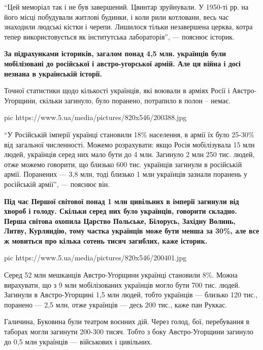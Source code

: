 \enquote{Цей меморіал так і не був завершений. Цвинтар зруйнували. У 1950-ті рр.
на його місці побудували житлові будинки, і коли рили котловани, весь час
знаходили людські кістки і черепи. Лишилося тільки незавершена церква,
котра тепер використовується як інститутська лабораторія}, --- пояснює
історик.

\begin{leftbar}
	\bfseries
За підрахунками істориків, загалом понад 4,5 млн. українців були
мобілізовані до російської і австро-угорської армій. Але ця війна і досі
незнана в українській історії.
\end{leftbar}

Точної статистики щодо кількості українців, які воювали в арміях Росії і
Австро-Угорщини, скільки загинуло, було поранено, потрапило в полон –
немає.

\ifcmt
pic https://www.5.ua/media/pictures/820x546/200388.jpg
\fi

\enquote{У Російській імперії українці становили 18\% населення, в армії їх було
25-30\% від загальної численності. Можемо розрахувати: якщо Росія
мобілізувала 15 млн людей, українців серед них мало бути до 4 млн.
Загинуло 2 млн 250 тис. людей, отже можемо говорити, що близько 600 тис.
українців загинули в російській армії. Поранених --- 3,8 млн, тоді близько 1
млн українців зазнали поранень у російській армії}, --- пояснює він.

\begin{leftbar}
	\bfseries
Під час Першої світової понад 1 млн цивільних в імперії загинули від
хвороб і голоду. Скільки серед них було українців, говорити складно.
Перша світова охопила Царство Польське, Білорусь, Західну Волинь, Литву,
Курляндію, тому частка українців може бути менша за 30\%, але все ж
мовиться про кілька сотень тисяч загиблих, каже історик.
\end{leftbar}

\ifcmt
pic https://www.5.ua/media/pictures/820x546/200401.jpg
\fi

Серед 52 млн мешканців Австро-Угорщини українці становили 8\%. Можна
вирахувати, що з 9 млн мобілізованих українців могло бути 700 тис. людей.
Загинули в Австро-Угорщині 1,5 млн людей, тобто українців --- близько 120
тис., поранено --- 2,5 млн, отже українців --- десь 200 тис., каже пан Руккас.

Галичина, Буковина були театром воєнних дій. Через голод, бої, перебування
в таборах могли загинути 200-300 тисяч. Тобто з боку Австро-Угорщини
загинуло до 0,5 млн українців --- військових і цивільних.

